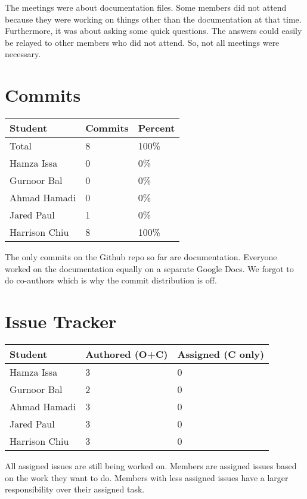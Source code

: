 \documentclass{article}
\begin{document}
The meetings were about documentation files. Some members did not attend because they were working on things other than the documentation at that time. Furthermore, it was about asking some quick questions. The answers could easily be relayed to other members who did not attend. So, not all meetings were necessary.

\section{Commits}


\begin{table}[H]
\centering
\begin{tabular}{lll}
\toprule
\textbf{Student} & \textbf{Commits} & \textbf{Percent}\\
\midrule
Total & 8 & 100\% \\
Hamza Issa & 0 & 0\%\\
Gurnoor Bal & 0 & 0\%\\
Ahmad Hamadi & 0 & 0\%\\
Jared Paul & 1 & 0\%\\
Harrison Chiu & 8 & 100\%\\
\bottomrule
\end{tabular}
\end{table}

The only commits on the Github repo so far are documentation.
Everyone worked on the documentation equally on a separate Google Docs. We forgot to do co-authors which is why the commit distribution is off.

\section{Issue Tracker}


\begin{table}[H]
\centering
\begin{tabular}{lll}
\toprule
\textbf{Student} & \textbf{Authored (O+C)} & \textbf{Assigned (C only)}\\
\midrule
Hamza Issa & 3 & 0\\
Gurnoor Bal & 2 & 0\\
Ahmad Hamadi & 3 & 0\\
Jared Paul & 3 & 0\\
Harrison Chiu & 3 & 0\\
\bottomrule
\end{tabular}
\end{table}

All assigned issues are still being worked on. Members are assigned issues based on the work they want to do. Members with less assigned issues have a larger responsibility over their assigned task.
\end{document}
